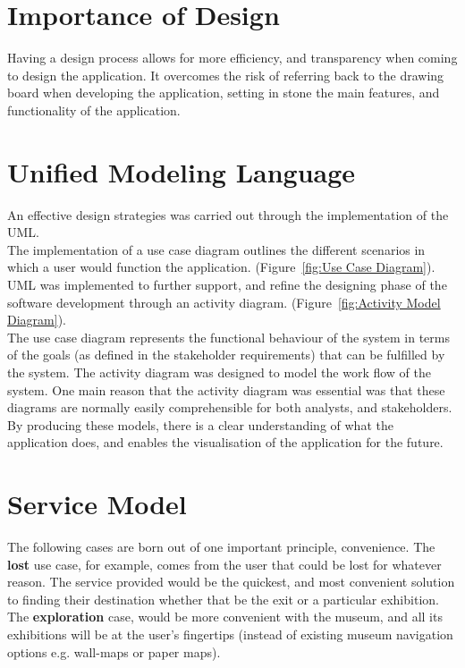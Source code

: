 
\section{Importance of Design}
Having a design process allows for more efficiency, and transparency when coming to design the application. It overcomes the risk of referring back to the drawing board when developing the application, setting in stone the main features, and functionality of the application.

\section{Unified Modeling Language}
An effective design strategies was carried out through the implementation of the UML.\\

The implementation of a use case diagram outlines the different scenarios in which a user would function the application. (Figure~\ref{fig:Use Case Diagram}). UML was implemented to further support, and refine the designing phase of the software development through an activity diagram. (Figure~\ref{fig:Activity Model Diagram}).\\

The use case diagram represents the functional behaviour of the system in terms of the goals (as defined in the stakeholder requirements) that can be fulfilled by the system. The activity diagram was designed to model the work flow of the system. One main reason that the activity diagram was essential was that these diagrams are normally easily comprehensible for both analysts, and stakeholders. By producing these models, there is a clear understanding of what the application does, and enables the visualisation of the application for the future.

\section{Service Model}
The following cases are born out of one important principle, convenience. The \textbf{lost} use case, for example, comes from the user that could be lost for whatever reason. The service provided would be the quickest, and most convenient solution to finding their destination whether that be the exit or a particular exhibition. The \textbf{exploration} case, would be more convenient with the museum, and all its exhibitions will be at the user's fingertips (instead of existing museum navigation options e.g. wall-maps or paper maps).

